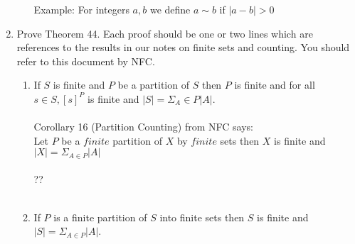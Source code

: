 \documentclass[11pt]{article}
\begin{document}
\begin{enumerate}
\begin{enumerate}
Example: For integers $a,b$ we define $a \sim b$ if $|a-b| > 0$
\end{enumerate}

\newpage %
\item Prove Theorem 44. Each proof should be one or two lines which are references to the results in our notes on finite sets and counting. You should refer to this document by NFC.
\begin{enumerate}
\item If $S$ is finite and $P$ be a partition of $S$ then $P$ is finite and for all $s \in S, [s]^P$ is finite and $|S| = \Sigma_A \in P|A|$.
\\
\\
Corollary 16 (Partition Counting) from NFC says:\\
Let $P$ be a $finite$ partition of $X$ by $finite$ sets then $X$ is finite and $|X| = \Sigma_{A \in P}|A|$
\\
\\
??
\\
\\

\item If $P$ is a finite partition of $S$ into finite sets then $S$ is finite and $|S| = \Sigma_{A \in P}|A|$.
\\
\\
\\
\\
\\
\\
\\

\end{enumerate}


\end{enumerate}
\end{document}
